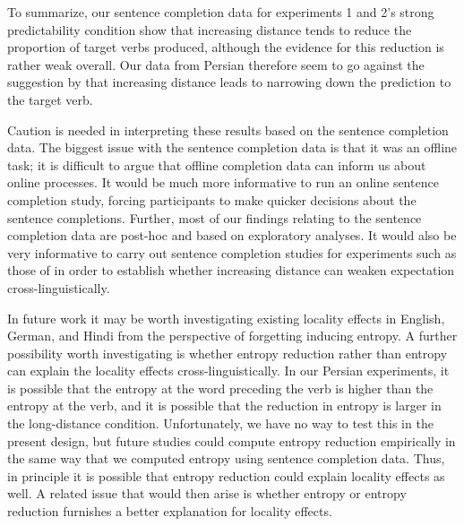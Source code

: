 \documentclass{frontiersSCNS}\usepackage{knitr} %
\begin{document}
To summarize, our sentence completion data for experiments 1 and 2's strong predictability condition show that increasing distance tends to reduce the proportion of target verbs produced, although the evidence for this reduction is rather weak overall. Our data from Persian therefore seem to go against the suggestion by \citet{konieczny2000locality} that increasing distance leads to narrowing down the prediction to the target verb. 

Caution is needed in interpreting these results based on the sentence completion data. The biggest issue with the sentence completion data is that it was an offline task; it is difficult to argue that offline completion data can inform us about online processes. It would be much more informative to run an online sentence completion study, forcing participants to make quicker decisions about the sentence completions.
Further, most of our findings relating to the sentence completion data are post-hoc and based on exploratory analyses. 
It would also be very informative to carry out sentence completion studies for experiments such as those of \citet{konieczny2000locality,grodner2005consequences,bartek2011search,vasishth2006argument,vasishth2011locality,levy2013expectation} in order to establish whether increasing distance can weaken expectation cross-linguistically. 

\medskip

In future work it may be worth investigating  existing locality effects in English, German, and Hindi from the perspective of forgetting inducing entropy. 
A further possibility worth investigating is whether entropy reduction \citep{hale06} rather than entropy can
explain the locality effects cross-linguistically.  
In our Persian experiments, it is possible that the entropy at the word preceding the verb is
higher than the entropy at the verb, and it is possible that the reduction in entropy is larger in the long-distance condition. Unfortunately, we have no way to test this in the present design, but future studies could compute entropy reduction empirically in the same way that we computed entropy using sentence completion data. Thus, in principle 
it is possible that entropy reduction
could explain locality effects as well. A related issue that would then arise is whether entropy or entropy reduction furnishes a better explanation for locality effects. 
\end{document}
